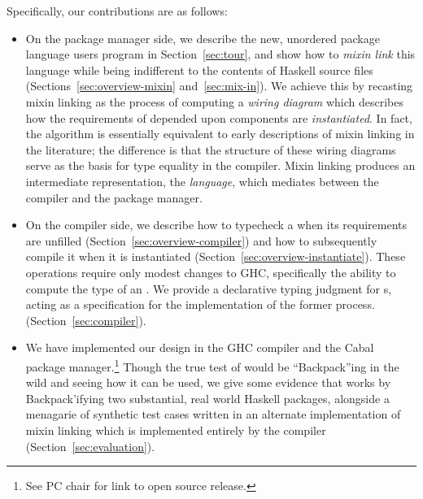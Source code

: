 Specifically, our contributions are as follows:
\begin{itemize}

    \item On the package manager side, we describe the new,
    unordered package language users program in Section~\ref{sec:tour}, and
    show how to \emph{mixin link} this language while being indifferent
    to the contents of Haskell source files (Sections~\ref{sec:overview-mixin} and~\ref{sec:mix-in}).  We achieve
    this by recasting mixin linking as the process of computing a
    \emph{wiring diagram} which describes how the requirements of depended upon
    components are \emph{instantiated}.  In fact, the algorithm
    is essentially equivalent to early descriptions of mixin linking
    in the literature; the difference
    is that the structure of these wiring diagrams serve as the
    basis for type equality in the compiler.  Mixin linking produces
    an intermediate representation, the \emph{\unit{} language}, which
    mediates between the compiler and the package manager.

  \item On the compiler side, we describe how to typecheck a
    \unit{} when its requirements are unfilled (Section~\ref{sec:overview-compiler}) and how to
    subsequently compile it when it is instantiated (Section~\ref{sec:overview-instantiate}).
    These operations require only modest changes to GHC\@, specifically
    the ability to compute the type of an \iunit{}.
    We provide a declarative typing judgment for \unit{}s,
    acting as a specification for the implementation of the former process.
    (Section~\ref{sec:compiler}).



    \item We have implemented our design in the GHC compiler and the
    Cabal package manager.\footnote{See PC chair for link to open source release.}
    Though the true test of \Backpack{} would be
    ``Backpack''ing in the wild and seeing how it can be used, we give
    some evidence that \Backpack{} works by
    Backpack'ifying two substantial, real world Haskell packages,
    alongside a menagarie of synthetic test cases written in an alternate
    implementation of mixin linking which is implemented entirely
    by the compiler
    (Section~\ref{sec:evaluation}).

\end{itemize}

